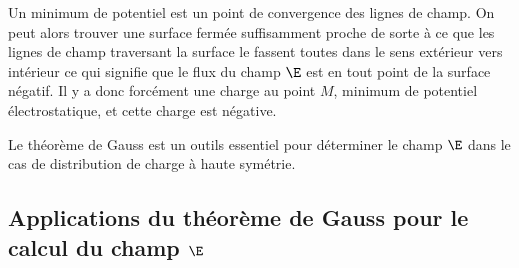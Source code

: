 \documentclass[12pt,fancy]{/Users/victor/Documents/COURS/2ACapECL/texmf/tex/latex/Preambles/cours}
\begin{document}
\begin{liste}
\item Un minimum de potentiel est un point de convergence des lignes de champ. On peut alors trouver une surface fermée suffisamment proche de sorte à ce que les lignes de champ traversant la surface le fassent toutes dans le sens extérieur vers intérieur ce qui signifie que le flux du champ $\E$ est en tout point de la surface négatif. 
Il y a donc forcément une charge au point $M$, minimum de potentiel électrostatique, et cette charge est négative.
\begin{center}
\end{center}
\end{liste}

\noindent Le théorème de Gauss est un outils essentiel pour déterminer le champ $\E$ dans le cas de distribution de charge à haute symétrie.

\subsection{Applications du théorème de Gauss pour le calcul du champ $\E$}

\end{document}
